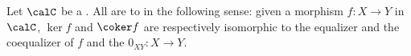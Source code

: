\begin{lemma} \label{lemma:kernel_cokernel_of_morphisms_in_a_pointed_category_are_equalizers_coequalizers}
    Let $\calC$ be a . All  are to  in the following sense: given a morphism $f: X \to Y$ in $\calC$, $\ker f$ and $\coker f$ are respectively isomorphic to the equalizer and the coequalizer of $f$ and the  $0_{XY}: X \to Y$.
\end{lemma}